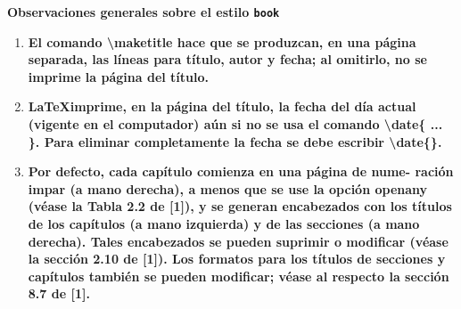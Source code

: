 \documentclass[12pt]{book}
\begin{document}
\begin{center}



\end{center}
{\bf
Observaciones generales sobre el estilo {\tt book}}
\begin{enumerate}
    
    \item[\HandCuffRight] {\bf El comando \textbackslash maketitle hace que se produzcan, en una página
    separada, las líneas para título, autor y fecha; al omitirlo, no
    se imprime la página del título.}
    \item[\HandCuffRight] {\bf \LaTeX imprime, en la página del título, la fecha del día actual
    (vigente en el computador) aún si no se usa el comando
    \textbackslash date\{ ... \}. Para eliminar completamente la fecha se debe
    escribir \textbackslash date\{\}.}
    \item[\HandCuffRight] {\bf Por defecto, cada capítulo comienza en una página de nume-
    ración impar (a mano derecha), a menos que se use la opción
    openany (véase la Tabla 2.2 de [1]), y se generan encabezados
    con los títulos de los capítulos (a mano izquierda) y de las
    secciones (a mano derecha). Tales encabezados se pueden suprimir o 
    modificar (véase la sección 2.10 de [1]). Los formatos
    para los títulos de secciones y capítulos también se pueden
    modificar; véase al respecto la sección 8.7 de [1].}
\end{enumerate}
\end{document}
